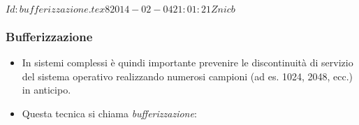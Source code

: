 %
%
%
%
%
\svnInfo $Id: bufferizzazione.tex 8 2014-02-04 21:01:21Z nicb $

\begin{frame}
	\frametitle{Bufferizzazione}

	\begin{itemize}[<+- | alert@+->]

		\item In sistemi complessi \`e quindi importante
              prevenire le discontinuit\`a di servizio
              del sistema operativo realizzando numerosi
              campioni (ad es. 1024, 2048, ecc.) in anticipo.

		\item Questa tecnica si chiama \emph{bufferizzazione}:

        \begin{figure}[H]
            \begin{center}
            \end{center}
            \label{fig:bufferizzazione}
        \end{figure}

	\end{itemize}

\end{frame}
